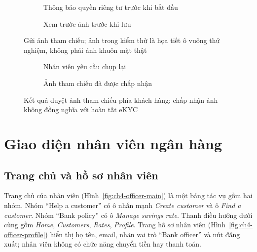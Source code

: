 \begin{figure}[H]
\centering
\begin{subfigure}[t]{0.4\textwidth}
  \centering
  \caption{Thông báo quyền riêng tư trước khi bắt đầu}
  \label{fig:ch4-reference-start}
\end{subfigure}\hspace{0.05\textwidth}%
\begin{subfigure}[t]{0.4\textwidth}
  \centering
  \caption{Xem trước ảnh trước khi lưu}
  \label{fig:ch4-reference-preview}
\end{subfigure}
\caption{Gửi ảnh tham chiếu; ảnh trong kiểm thử là họa tiết ô vuông thử nghiệm, không phải ảnh khuôn mặt thật}
\label{fig:ch4-reference}
\end{figure}

\begin{figure}[H]
\centering
\begin{subfigure}[t]{0.4\textwidth}
  \centering
  \caption{Nhân viên yêu cầu chụp lại}
  \label{fig:ch4-reference-changes}
\end{subfigure}\hspace{0.05\textwidth}%
\begin{subfigure}[t]{0.4\textwidth}
  \centering
  \caption{Ảnh tham chiếu đã được chấp nhận}
  \label{fig:ch4-reference-accepted}
\end{subfigure}
\caption{Kết quả duyệt ảnh tham chiếu phía khách hàng; chấp nhận ảnh không đồng nghĩa với hoàn tất eKYC}
\label{fig:ch4-reference-status}
\end{figure}

\section{Giao diện nhân viên ngân hàng}
\label{sec:ch4-officer}

\subsection{Trang chủ và hồ sơ nhân viên}
\label{sec:ch4-officer-home}

Trang chủ của nhân viên (Hình~\ref{fig:ch4-officer-main}) là một bảng tác vụ gồm hai nhóm. Nhóm ``Help a customer'' có ô nhấn mạnh \textit{Create customer} và ô \textit{Find a customer}. Nhóm ``Bank policy'' có ô \textit{Manage savings rate}. Thanh điều hướng dưới cùng gồm \textit{Home}, \textit{Customers}, \textit{Rates}, \textit{Profile}. Trang hồ sơ nhân viên (Hình~\ref{fig:ch4-officer-profile}) hiển thị họ tên, email, nhãn vai trò ``Bank officer'' và nút đăng xuất; nhân viên không có chức năng chuyển tiền hay thanh toán.


